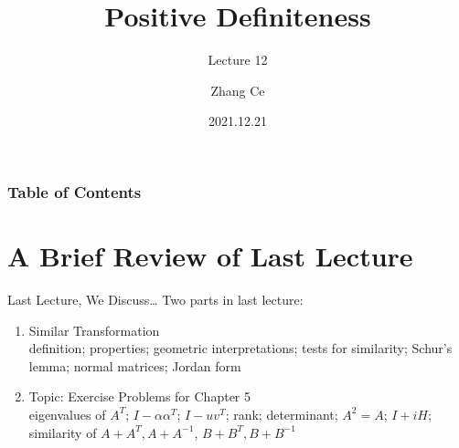 \documentclass{beamer}
\title[Linear Algebra] %
{Positive Definiteness}
\subtitle{Lecture 12}
\author[11910803@mail.sustech.edu.cn] %
{
    Zhang Ce
}
\institute[] %
{
    Department of Electrical and Electronic Engineering\\
    Southern University of Science and Technology
}
\date[2021.12.21] %
{2021.12.21}
\begin{document}
\frame{\titlepage}


\begin{frame}
\frametitle{Table of Contents}
\tableofcontents
\end{frame}
\section{A Brief Review of Last Lecture}
\begin{frame}{Last Lecture, We Discuss\dots}
Two parts in last lecture:
    \begin{enumerate}
        \item Similar Transformation\\
        definition; properties; geometric interpretations; tests for similarity; Schur's lemma; normal matrices; Jordan form
        \item Topic: Exercise Problems for Chapter 5\\
        eigenvalues of $A^T$; $I-\alpha \alpha^T$; $I-u v^T$; rank; determinant; $A^2=A$; $I+iH$; similarity of $A+A^T, A+A^{-1}$, $B+B^T, B+B^{-1}$
    \end{enumerate}

\end{frame}
\end{document}
